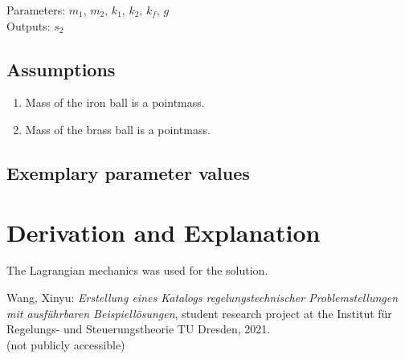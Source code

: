 \documentclass[10pt,a4paper]{article}
\begin{document}
	\noindent
	Parameters: $m_1, \, m_2, \, k_1, \, k_2, \, k_f, \, g$  %
	\\
	Outputs: $s_2$ %
	
	
	\subsection{Assumptions} %
		\begin{enumerate} %
			\item Mass of the iron ball is a pointmass.
			\item Mass of the brass ball is a pointmass.
		\end{enumerate}
	
	
	\subsection{Exemplary parameter values}
	

	
	\section{Derivation and Explanation} %
	
	The Lagrangian mechanics was used for the solution.
	
	
	\begin{thebibliography}{10}		
		Wang, Xinyu: 
		\textit{Erstellung eines Katalogs regelungstechnischer Problemstellungen mit ausführbaren Beispiellösungen}, student research project at the Institut für Regelungs- und Steuerungstheorie TU Dresden, 2021. \\
		(not publicly accessible)
	\end{thebibliography}
\end{document}
